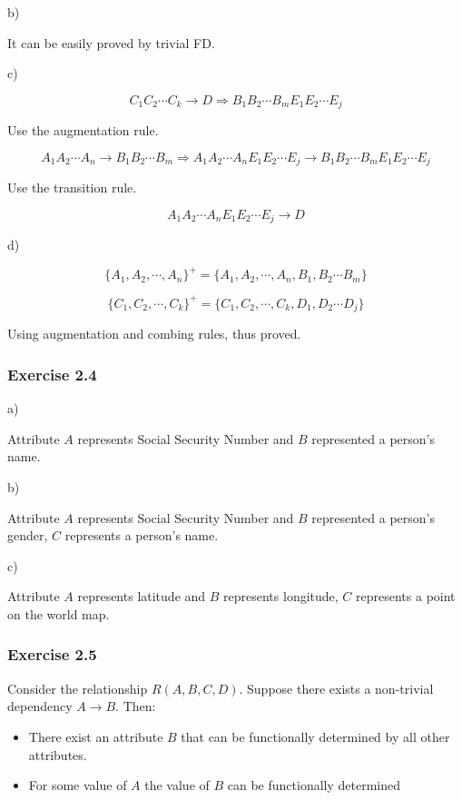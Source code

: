 b)

It can be easily proved by trivial FD.

c)

$$
C_{1}C_{2}\cdots C_{k} \to D \Rightarrow B_{1}
B_{2}\cdots B_{m} E_{1}E_{2}\cdots E_{j}
$$

Use the augmentation rule.

$$
A_{1}A_{2}\cdots A_{n} \to B_{1}B_{2} \cdots B_{m}
\Rightarrow A_{1}A_{2}\cdots A_{n}E_{1}E_{2}\cdots E_{j}
\to B_{1}B_{2}\cdots B_{m} E_{1}E_{2}\cdots E_{j}
$$

Use the transition rule.

$$
A_{1}A_{2}\cdots A_{n}E_{1}E_{2}\cdots E_{j} \to D
$$

d)

$$
\{A_{1}, A_{2}, \cdots, A_{n}\} ^ {+} = \{A_{1}, A_{2}, \cdots, A_{n}, B_{1}
,B_{2} \cdots B_{m} \}
$$

$$
\{C_{1}, C_{2}, \cdots, C_{k}\} ^ {+} = \{C_{1}, C_{2}, \cdots, C_{k}, D_{1}
,D_{2} \cdots D_{j} \}
$$

Using augmentation and combing rules, thus proved.

\subsubsection*{Exercise 2.4}

a)

Attribute $A$ represents Social Security Number and $B$
represented a person's name.

b)

Attribute $A$ represents Social Security Number and $B$
represented a person's gender, $C$ represents a person's name.

c)

Attribute $A$ represents latitude and $B$ represents longitude,
$C$ represents a point on the world map.

\subsubsection*{Exercise 2.5}

Consider the relationship $R(A,B,C,D)$. Suppose there exists
a non-trivial dependency $A \to B$. Then:

\begin{itemize}
  \item There exist an attribute $B$ that can be functionally
        determined by all other attributes.
  \item For some value of $A$ the value of $B$ can be functionally
        determined
\end{itemize}

